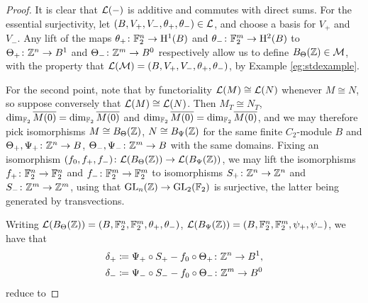 \begin{proof}
  It is clear that ${\mathcal L}(-)$ is additive and commutes with direct sums. For the essential surjectivity, let $(B, V_+, V_-, \theta_+, \theta_-) \in {\mathcal L}$, and choose a basis for $V_+$ and $V_-$. Any lift of the maps $\theta_+ \colon {\mathbb F}_2^n \rightarrow \mathrm{H}^1(B)$ and $\theta_- \colon {\mathbb F}_2^m \rightarrow \mathrm{H}^2(B)$ to $\Theta_+ \colon {\mathbb Z}^n \rightarrow B^1$ and $\Theta_- \colon {\mathbb Z}^m \rightarrow B^0$ respectively allow us to define $B_{\Theta}({\mathbb Z}) \in {\mathcal M}$, with the property that ${\mathcal L}({\mathcal M}) = (B, V_+, V_-, \theta_+, \theta_-)$, by Example \ref{eg:stdexample}.

  For the second point, note that by functoriality ${\mathcal L}(M) \cong {\mathcal L}(N)$ whenever $M \cong N$, so suppose conversely that ${\mathcal L}(M) \cong {\mathcal L}(N)$. Then $M_T \cong N_T$, $\dim_{{\mathbb F}_2}\overline{M(0)} = \dim_{{\mathbb F}_2}\overline{M(0)}$ and $\dim_{{\mathbb F}_2}\overline{M(0)} = \dim_{{\mathbb F}_2}\overline{M(0)}$, and we may therefore pick isomorphisms $M \cong B_{\Theta}({\mathbb Z})$, $N \cong B_{\Psi}({\mathbb Z})$ for the same finite $C_2$-module $B$ and $\Theta_+, \Psi_+ \colon {\mathbb Z}^n \rightarrow B$, $\Theta_-, \Psi_- \colon {\mathbb Z}^m \rightarrow B$ with the same domains. Fixing an isomorphism $(f_0,f_+,f_-) \colon {\mathcal L}(B_{\Theta}({\mathbb Z})) \rightarrow {\mathcal L}(B_{\Psi}({\mathbb Z}))$, we may lift the isomorphisms $f_+ \colon {\mathbb F}_2^n \rightarrow {\mathbb F}_2^n$ and $f_- \colon {\mathbb F}_2^m \rightarrow {\mathbb F}_2^m$ to isomorphisms $S_+ \colon {\mathbb Z}^n \rightarrow {\mathbb Z}^n$ and $S_- \colon {\mathbb Z}^m \rightarrow {\mathbb Z}^m$, using that $\operatorname{GL}_n({\mathbb Z}) \rightarrow \operatorname{GL}_2({\mathbb F}_2)$ is surjective, the latter being generated by transvections. 

  Writing ${\mathcal L}(B_{\Theta}({\mathbb Z})) = (B, {\mathbb F}_2^n, {\mathbb F}_2^m, \theta_+, \theta_-)$, ${\mathcal L}(B_{\Psi}({\mathbb Z})) = (B, {\mathbb F}_2^n, {\mathbb F}_2^m, \psi_+, \psi_-)$, we have that 
  \begin{align*}
    \delta_+ &\coloneqq \Psi_+ \circ S_+ - f_0 \circ \Theta_+ \colon {\mathbb Z}^n \rightarrow B^1, \\
    \delta_- &\coloneqq \Psi_- \circ S_- - f_0 \circ \Theta_- \colon {\mathbb Z}^m \rightarrow B^0
  \end{align*}
  reduce to
  

\end{proof}

